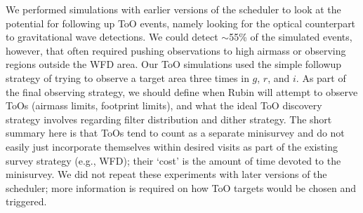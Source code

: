 We performed simulations with earlier versions of the scheduler to look at the potential for following up ToO events, namely looking for the optical counterpart to gravitational wave detections.  We could detect $\sim$55\% of the simulated events, however, that often required pushing observations to high airmass or observing regions outside the WFD area. Our ToO simulations used the simple followup strategy of trying to observe a target area three times in $g$, $r$, and $i$. As part of the final observing strategy, we should define when Rubin will attempt to observe ToOs (airmass limits, footprint limits), and what the ideal ToO discovery strategy involves regarding filter distribution and dither strategy. The short summary here is that ToOs tend to count as a separate minisurvey and do not easily just incorporate themselves within desired visits as part of the existing survey strategy (e.g., WFD); their `cost' is the amount of time devoted to the minisurvey. We did not repeat these experiments with later versions of the scheduler; more information is required on how ToO targets would be chosen and triggered. 
